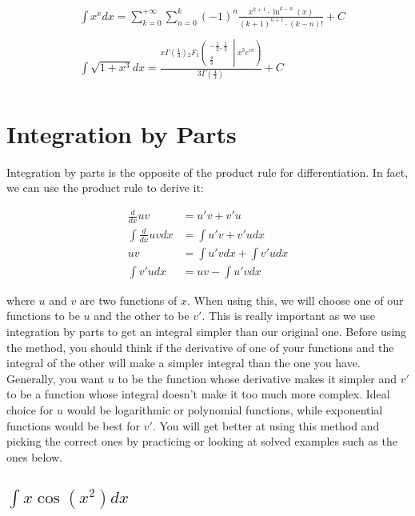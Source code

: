 \documentclass[12pt]{article}
\begin{document}
\begin{align}
     & \int x^x dx =  \sum_{k = 0}^{+\infty}\sum_{n = 0}^k (-1)^n \frac{x^{k+1} \cdot \ln^{k-n}(x)}{(k+1)^{n+1}\cdot (k-n)!} + C                                                                                                       \\ \nonumber \\
     & \int \sqrt{1+x^3} dx = \frac{x \Gamma\left(\frac{1}{3}\right) {{}_{2}F_{1}\left(\begin{matrix} - \frac{1}{2}, \frac{1}{3} \\ \frac{4}{3} \end{matrix}\middle| {x^{3} e^{i \pi}} \right)}}{3 \Gamma\left(\frac{4}{3}\right)} + C \\ \nonumber
\end{align}

\section{Integration by Parts}

Integration by parts is the opposite of the product rule for differentiation.
In fact, we can use the product rule to derive it:


\begin{align}
    \frac{d}{dx}uv         & = u'v + v'u                 \\
    \int \frac{d}{dx}uv dx & = \int u'v + v'u dx         \\
    uv                     & = \int u'v dx + \int v'u dx \\
    \int v'u dx            & = uv - \int u'v dx
\end{align}


where $u$ and $v$ are two functions of $x$.
When using this, we will choose one of our functions to be $u$ and the other to be $v'$.
This is really important as we use integration by parts to get an integral simpler than our original one.
Before using the method, you should think if the derivative of one of your functions and the integral of the other will make a simpler integral than the one you have.
Generally, you want $u$ to be the function whose derivative makes it simpler and $v'$ to be a function whose integral doesn't make it too much more complex.
Ideal choice for $u$ would be logarithmic or polynomial functions, while exponential functions would be best for $v'$.
You will get better at using this method and picking the correct ones by practicing or looking at solved examples such as the ones below.

\subsection{$\int x\cos(x^2) dx$}
\end{document}
